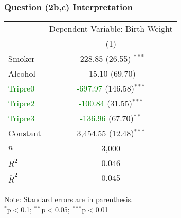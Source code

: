 \documentclass[11pt, xcolor=x11names,compress]{beamer}
\begin{document}
\begin{frame}[fragile,t]
\frametitle{Question (2b,c) Interpretation} 
\begin{center}
\begin{threeparttable}
\begin{tabular}{lc} 
\hline 
 & \multicolumn{1}{c}{Dependent Variable: Birth Weight} \\ 
\cline{2-2} 
 & (1) \\ 
\hline 
 Smoker & -228.85 (26.55) $^{***}$ \\ 
  Alcohol & -15.10 (69.70)\\ 
  \textcolor{green}{Tripre0} & \textcolor{green}{-697.97} (146.58)$^{***}$ \\ 
  \textcolor{green}{Tripre2} & \textcolor{green}{-100.84} (31.55)$^{***}$ \\ 
  \textcolor{green}{Tripre3} & \textcolor{green}{-136.96} (67.70)$^{**}$ \\ 
  Constant & 3,454.55 (12.48)$^{***}$ \\ 
 \hline 
$n$ & 3,000\\
$R^{2}$ & 0.046 \\
$\overline{R}^{2}$ & 0.045 \\
\hline 
\end{tabular} 
\begin{tablenotes}[flushleft]
\footnotesize
Note: Standard errors are in parenthesis. \\
$^{*}$p$<$0.1; $^{**}$p$<$0.05; $^{***}$p$<$0.01 \\ 
\end{tablenotes}
\end{threeparttable}
\end{center}
\end{frame}
\end{document}
